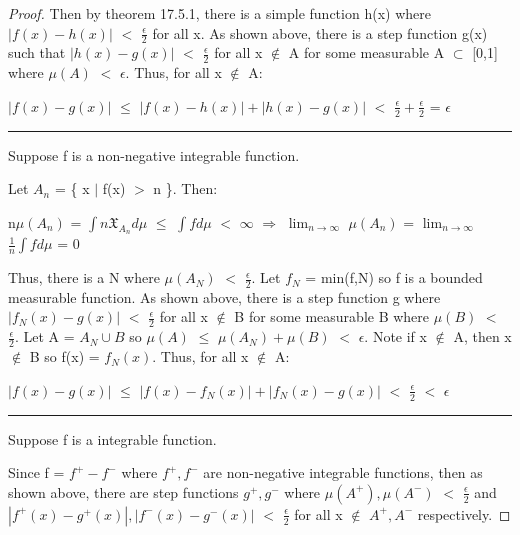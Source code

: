 \begin{proof}
        Then by {\color{red} theorem 17.5.1}, there is a simple function
        h(x) where $|f(x) - h(x)|$ $<$ $\frac{\epsilon}{2}$ for all x.
        As shown above, there is a step function g(x)
        such that $|h(x) - g(x)|$ $<$ $\frac{\epsilon}{2}$
        for all x $\not \in$ A for some measurable A $\subset$ [0,1]
        where $\mu(A)$ $<$ $\epsilon$. Thus, for all x $\not \in$ A:

        \hspace{0.5cm}
        $|f(x) - g(x)|$
        $\leq$ $|f(x) - h(x)| + |h(x) - g(x)|$
        $<$ $\frac{\epsilon}{2} + \frac{\epsilon}{2}$
        = $\epsilon$

        \rule[0.1cm]{16.7cm}{0.01cm}

        Suppose f is a non-negative integrable function.

        Let $A_n$ = \{ x $|$ f(x) $>$ n \}. Then:

        \hspace{0.5cm}
        n$\mu(A_n)$ = $\int n \mathfrak{X}_{A_n} d\mu$
        $\leq$ $\int f d\mu$
        $<$ $\infty$
        \hspace{0.2cm}
        $\Rightarrow$
        \hspace{0.2cm}
        $\lim_{n \rightarrow \infty}$ $\mu(A_n)$
        = $\lim_{n \rightarrow \infty}$ $\frac{1}{n} \int f d\mu$
        = 0

        Thus, there is a N where $\mu(A_N)$ $<$ $\frac{\epsilon}{2}$.
        Let $f_N$ = min(f,N) so f is a bounded measurable function.
        As shown above, there is a step function g where
        $|f_N(x) - g(x)|$ $<$ $\frac{\epsilon}{2}$
        for all x $\not \in$ B for some measurable B
        where $\mu(B)$ $<$ $\frac{\epsilon}{2}$.
        Let A = $A_N \cup B$ so $\mu(A)$ $\leq$ $\mu(A_N) + \mu(B)$
        $<$ $\epsilon$.
        Note if x $\not \in$ A, then x $\not \in$ B so f(x) = $f_N(x)$.
        Thus, for all x $\not \in$ A:

        \hspace{0.5cm}
        $|f(x) - g(x)|$
        $\leq$ $|f(x) - f_N(x)| + |f_N(x) - g(x)|$
        $<$ $\frac{\epsilon}{2}$
        $<$ $\epsilon$

        \rule[0.1cm]{16.7cm}{0.01cm}

        Suppose f is a integrable function.

        Since f = $f^+ - f^-$ where $f^+,f^-$ are non-negative integrable
        functions, then as shown above, there are step functions
        $g^+,g^-$ where $\mu(A^+),\mu(A^-)$ $<$ $\frac{\epsilon}{2}$
        and $|f^+(x) - g^+(x)|,|f^-(x) - g^-(x)|$ $<$ $\frac{\epsilon}{2}$
        for all x $\not \in$ $A^+,A^-$ respectively.
        

\end{proof}
